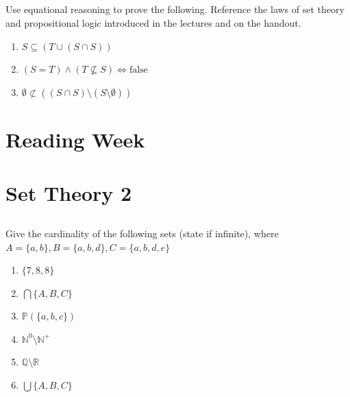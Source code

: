 \documentclass[twocolumn]{article}
\begin{document}
\subsection{}

Use equational reasoning to prove the following. Reference the laws of set theory and propositional logic introduced in the lectures and on the handout.

\begin{enumerate}
    \item $S \subseteq (T \cup (S \cap S)) $
    \item $ (S = T) \wedge (T \not\subseteq S) \Longleftrightarrow \text{false} $
    \item $ \emptyset \not\subset ((S \cap S) \setminus (S \setminus \emptyset)) $
\end{enumerate}

\clearpage
\section{Reading Week}
    

\clearpage
\section{Set Theory 2}

\subsection{}

    Give the cardinality of the following sets (state if infinite), where $ A = \{ a, b \}, B = \{ a, b, d\}, C = \{a, b, d, e \}$

    \begin{multicols}{2}
    \begin{enumerate}
        \item $\{ 7, 8, 8\}$
        \item $\bigcap \{ A, B, C \} $
        \item $\mathbb{P}(\{ a, b, c\})$
        \item $\mathbb{N}^0 \setminus \mathbb{N}^+$
        \item $\mathbb{Q} \setminus \mathbb{R}$
        \item $\bigcup \{ A, B, C \} $
    \end{enumerate}
\end{multicols}

\subsection{}
\end{document}
